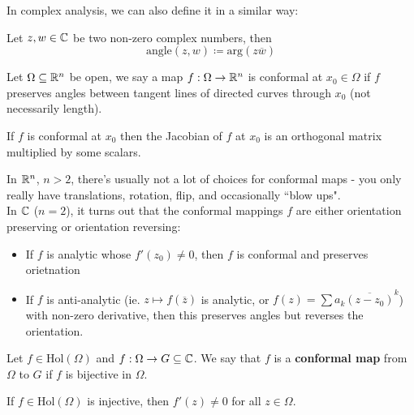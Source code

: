 In complex analysis, we can also define it in a similar way:
\begin{definition}
    Let $z, w \in \mathbb{C}$ be two non-zero complex numbers, then
    \[\text{angle}(z, w) \coloneqq \text{arg}(z \overline{w})\]
\end{definition}

\begin{definition}
    Let $\Omega \subseteq \mathbb{R}^n$ be open, we say a map $f: \Omega \to \mathbb{R}^n$ is conformal at $x_0 \in \Omega$ if $f$ preserves angles between tangent lines of directed curves through $x_0$ (not necessarily length). 
\end{definition}

\begin{fact}
    If $f$ is conformal at $x_0$ then the Jacobian of $f$ at $x_0$ is an orthogonal matrix multiplied by some scalars.
\end{fact}

In $\mathbb{R}^n$, $n > 2$, there's usually not a lot of choices for conformal maps - you only really have translations, rotation, flip, and occasionally ``blow ups".\\

In $\mathbb{C}$ ($n = 2$), it turns out that the conformal mappings $f$ are either orientation preserving or orientation reversing:
\begin{itemize}
    \item If $f$ is analytic whose $f'(z_0) \neq 0$, then $f$ is conformal and preserves orietnation
    \item If $f$ is anti-analytic (ie. $z \mapsto f(\overline{z})$ is analytic, or $f(z) = \sum a_k \overline{(z - z_0)}^k$) with non-zero derivative, then this preserves angles but reverses the orientation.
\end{itemize}

\begin{definition}
    Let $f \in \text{Hol}(\Omega)$ and $f: \Omega \to G \subseteq \mathbb{C}$. We say that $f$ is a \textbf{conformal map} from $\Omega$ to $G$ if $f$ is bijective in $\Omega$.
\end{definition}

\begin{proposition}
    If $f \in \text{Hol}(\Omega)$ is injective, then $f'(z) \neq 0$ for all $z \in \Omega$.
\end{proposition}

